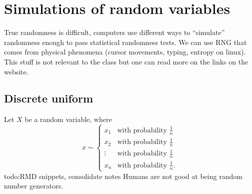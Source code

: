 \section{Simulations of random variables} 
True randomness is difficult, computers use different ways to ``simulate'' randomness enough to pass statistical randomness tests. We can use RNG that comes from physical phenomena (cursor movements, typing, entropy on linux). This stuff is not relevant to the class but one can read more on the links on the website.

\subsection{Discrete uniform}
Let $X$ be a random variable, where \[
x \sim 
\begin{cases}
    x_1 & \text{with probability } \frac{1}{n}\\
    x_2& \text{with probability } \frac{1}{n}\\
    \vdots& \text{with probability } \frac{1}{n}\\
    x_n & \text{with probability } \frac{1}{n}.

\end{cases}
\]  {\color{red}todo:RMD snippets, consolidate notes}  Humans are not good at  being random number generators.

